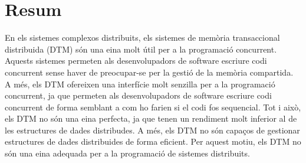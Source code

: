 \pagebreak
\thispagestyle{empty}
\section*{Resum}

En els sistemes complexos distribuits, els sistemes de memòria transaccional distribuida (DTM) són una eina molt útil per a la programació concurrent. Aquests sistemes permeten als desenvolupadors de software escriure codi concurrent sense haver de preocupar-se per la gestió de la memòria compartida. A més, els DTM ofereixen una interfície molt senzilla per a la programació concurrent, ja que permeten als desenvolupadors de software escriure codi concurrent de forma semblant a com ho farien si el codi fos sequencial. Tot i això, els DTM no són una eina perfecta, ja que tenen un rendiment molt inferior al de les estructures de dades distribudes. A més, els DTM no són capaços de gestionar estructures de dades distribuides de forma eficient. Per aquest motiu, els DTM no són una eina adequada per a la programació de sistemes distribuits.

\vfill